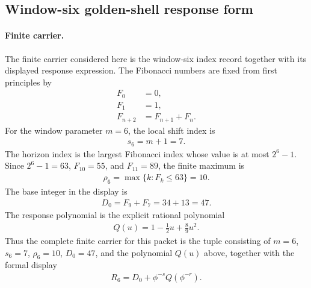 \subsection{Window-six golden-shell response form}\label{subsec:window6-functor-embedding-golden-shell-form-needs-external}

\paragraph{Finite carrier.}
The finite carrier considered here is the window-six index record together with its displayed response expression. The Fibonacci numbers are fixed from first principles by
$$
\begin{aligned}
F_0&=0,\\
F_1&=1,\\
F_{n+2}&=F_{n+1}+F_n.
\end{aligned}
$$
For the window parameter $m=6$, the local shift index is
$$
\begin{aligned}
s_6=m+1=7.
\end{aligned}
$$
The horizon index is the largest Fibonacci index whose value is at most $2^6-1$. Since $2^6-1=63$, $F_{10}=55$, and $F_{11}=89$, the finite maximum is
$$
\begin{aligned}
\rho_6=\max\{k:F_k\leq 63\}=10.
\end{aligned}
$$
The base integer in the display is
$$
\begin{aligned}
D_0=F_9+F_7=34+13=47.
\end{aligned}
$$
The response polynomial is the explicit rational polynomial
$$
\begin{aligned}
Q(u)=1-\frac{1}{2}u+\frac{8}{9}u^2.
\end{aligned}
$$
Thus the complete finite carrier for this packet is the tuple consisting of $m=6$, $s_6=7$, $\rho_6=10$, $D_0=47$, and the polynomial $Q(u)$ above, together with the formal display
$$
\begin{aligned}
R_6=D_0+\phi^{-s}Q(\phi^{-r}).
\end{aligned}
$$

